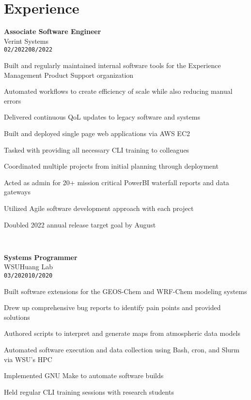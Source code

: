 \documentclass[11pt]{article}
\newenvironment{itemize*}%
  {\begin{itemize}[leftmargin=*,label=\faChevronRight]%
    \setlength{\itemsep}{0pt}%
    \setlength{\parskip}{0pt}%
    \setlength{\parsep}{0pt}}%
  {\end{itemize}}
\newcommand\workexp[5]{
    \hspace*{10pt}
    \begin{minipage}[t]{0.225\textwidth}
            \raggedleft
                \textbf{\fontsize{14}{10}\selectfont #1}\\ 
                #2\\
                \small\texttt{#3}\textendash \texttt{#4}
    \end{minipage}\hspace*{5pt}%
    \begin{minipage}[t]{0.7\textwidth}
        \fontsize{10}{10}\selectfont#5
    \end{minipage}
}
\begin{document}
\section*{Experience}
\vspace*{-10pt}\workexp{Associate Software Engineer}{Verint Systems}{02/2022}{08/2022}{%
    \begin{itemize*}
        \item Built and regularly maintained internal software tools for the Experience Management Product Support organization
        \item Automated workflows to create efficiency of scale while also reducing manual errors
        \item Delivered continuous QoL updates to legacy software and systems
        \item Built and deployed single page web applications via AWS EC2
        \item Tasked with providing all necessary CLI training to colleagues
        \item Coordinated multiple projects from initial planning through deployment
        \item Acted as admin for 20+ mission critical PowerBI waterfall reports and data gateways
        \item Utilized Agile software development approach with each project
        \item Doubled 2022 annual release target goal by August
    \end{itemize*}%
}
\vspace*{10pt}\\
\workexp{Systems Programmer}{WSU\textendash Huang Lab}{03/2020}{10/2020}{%
    \begin{itemize*}
        \item Built software extensions for the GEOS-Chem and WRF-Chem modeling systems
        \item Drew up comprehensive bug reports to identify pain points and provided solutions
        \item Authored scripts to interpret and generate maps from atmospheric data models
        \item Automated software execution and data collection using Bash, cron, and Slurm via WSU's HPC
        \item Implemented GNU Make to automate software builds
        \item Held regular CLI training sessions with research students
    \end{itemize*}%
}
\end{document}
